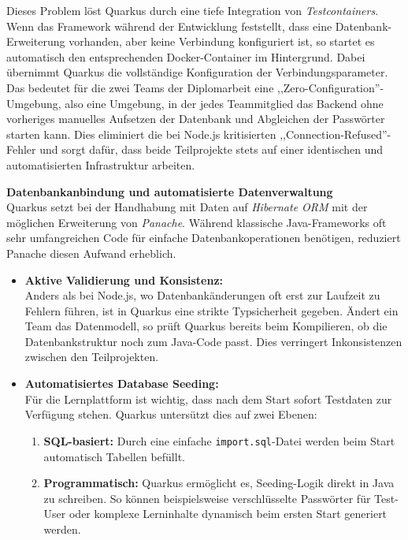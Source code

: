 Dieses Problem löst Quarkus durch eine tiefe Integration von \textit{Testcontainers}. Wenn das Framework während der Entwicklung feststellt, dass  eine Datenbank-Erweiterung vorhanden, aber keine Verbindung konfiguriert ist, so startet es automatisch den entsprechenden Docker-Container im Hintergrund. Dabei übernimmt Quarkus die vollständige Konfiguration der Verbindungsparameter. Das bedeutet für die zwei Teams der Diplomarbeit eine ,,Zero-Configuration''-Umgebung, also eine Umgebung, in der jedes Teammitglied das Backend ohne vorheriges manuelles Aufsetzen der Datenbank und Abgleichen der Passwörter starten kann. Dies eliminiert die bei Node.js kritisierten ,,Connection-Refused''-Fehler und sorgt dafür, dass beide Teilprojekte stets auf einer identischen und automatisierten Infrastruktur arbeiten. \cite{QuarkusDevServices}


\vspace{0.7cm}
\textbf{Datenbankanbindung und automatisierte Datenverwaltung} \\
Quarkus setzt bei der Handhabung mit Daten auf \textit{Hibernate ORM} mit der möglichen Erweiterung von \textit{Panache}. Während klassische Java-Frameworks oft sehr umfangreichen Code für einfache Datenbankoperationen benötigen, reduziert Panache diesen Aufwand erheblich. \cite{JavaPersistence}

\begin{itemize}
	\item \textbf{Aktive Validierung und Konsistenz:} \\
	Anders als bei Node.js, wo Datenbankänderungen oft erst zur Laufzeit zu Fehlern führen, ist in Quarkus eine strikte Typsicherheit gegeben. Ändert ein Team das Datenmodell, so prüft Quarkus bereits beim Kompilieren, ob die Datenbankstruktur noch zum Java-Code passt. Dies verringert Inkonsistenzen zwischen den Teilprojekten.
	
	\item \textbf{Automatisiertes Database Seeding:} \\
	Für die Lernplattform ist wichtig, dass nach dem Start sofort Testdaten zur Verfügung stehen. Quarkus untersützt dies auf zwei Ebenen:
	
	\begin{enumerate}
		\item \textbf{SQL-basiert:} Durch eine einfache \texttt{import.sql}-Datei werden beim Start automatisch Tabellen befüllt.
		\item \textbf{Programmatisch:} Quarkus ermöglicht es, Seeding-Logik direkt in Java zu schreiben. So können beispielsweise verschlüsselte Passwörter für Test-User oder komplexe Lerninhalte dynamisch beim ersten Start generiert werden.
	\end{enumerate}
\end{itemize}

